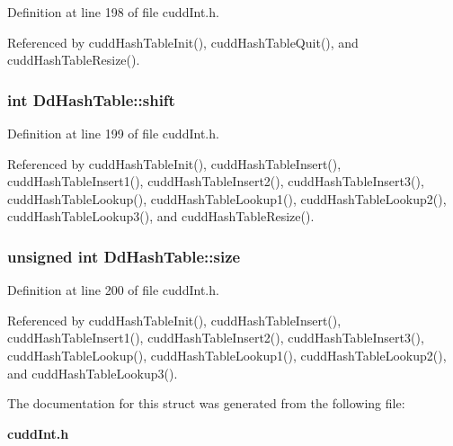 Definition at line 198 of file cudd\-Int.h.

Referenced by cudd\-Hash\-Table\-Init(), cudd\-Hash\-Table\-Quit(), and cudd\-Hash\-Table\-Resize().
\subsubsection{\setlength{\rightskip}{0pt plus 5cm}int \bf{Dd\-Hash\-Table::shift}}\label{structDdHashTable_01e29792ea99268274deff4fc7ab6a6a}




Definition at line 199 of file cudd\-Int.h.

Referenced by cudd\-Hash\-Table\-Init(), cudd\-Hash\-Table\-Insert(), cudd\-Hash\-Table\-Insert1(), cudd\-Hash\-Table\-Insert2(), cudd\-Hash\-Table\-Insert3(), cudd\-Hash\-Table\-Lookup(), cudd\-Hash\-Table\-Lookup1(), cudd\-Hash\-Table\-Lookup2(), cudd\-Hash\-Table\-Lookup3(), and cudd\-Hash\-Table\-Resize().
\subsubsection{\setlength{\rightskip}{0pt plus 5cm}unsigned int \bf{Dd\-Hash\-Table::size}}\label{structDdHashTable_fc17f434d1edc18767e6da7a53d64f2e}




Definition at line 200 of file cudd\-Int.h.

Referenced by cudd\-Hash\-Table\-Init(), cudd\-Hash\-Table\-Insert(), cudd\-Hash\-Table\-Insert1(), cudd\-Hash\-Table\-Insert2(), cudd\-Hash\-Table\-Insert3(), cudd\-Hash\-Table\-Lookup(), cudd\-Hash\-Table\-Lookup1(), cudd\-Hash\-Table\-Lookup2(), and cudd\-Hash\-Table\-Lookup3().

The documentation for this struct was generated from the following file:\begin{CompactItemize}
\item 
\bf{cudd\-Int.h}\end{CompactItemize}
